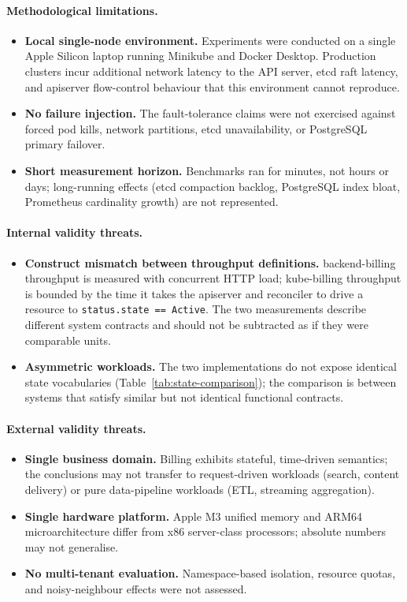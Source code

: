 \paragraph{Methodological limitations.}
\begin{itemize}
    \item \textbf{Local single-node environment.} Experiments were conducted on a single Apple Silicon laptop running Minikube and Docker Desktop. Production clusters incur additional network latency to the API server, etcd raft latency, and apiserver flow-control behaviour that this environment cannot reproduce.
    \item \textbf{No failure injection.} The fault-tolerance claims were not exercised against forced pod kills, network partitions, etcd unavailability, or PostgreSQL primary failover.
    \item \textbf{Short measurement horizon.} Benchmarks ran for minutes, not hours or days; long-running effects (etcd compaction backlog, PostgreSQL index bloat, Prometheus cardinality growth) are not represented.
\end{itemize}

\paragraph{Internal validity threats.}
\begin{itemize}
    \item \textbf{Construct mismatch between throughput definitions.} backend-billing throughput is measured with concurrent HTTP load; kube-billing throughput is bounded by the time it takes the apiserver and reconciler to drive a resource to \texttt{status.state == Active}. The two measurements describe different system contracts and should not be subtracted as if they were comparable units.
    \item \textbf{Asymmetric workloads.} The two implementations do not expose identical state vocabularies (Table~\ref{tab:state-comparison}); the comparison is between systems that satisfy similar but not identical functional contracts.
\end{itemize}

\paragraph{External validity threats.}
\begin{itemize}
    \item \textbf{Single business domain.} Billing exhibits stateful, time-driven semantics; the conclusions may not transfer to request-driven workloads (search, content delivery) or pure data-pipeline workloads (ETL, streaming aggregation).
    \item \textbf{Single hardware platform.} Apple M3 unified memory and ARM64 microarchitecture differ from x86 server-class processors; absolute numbers may not generalise.
    \item \textbf{No multi-tenant evaluation.} Namespace-based isolation, resource quotas, and noisy-neighbour effects were not assessed.
\end{itemize}

